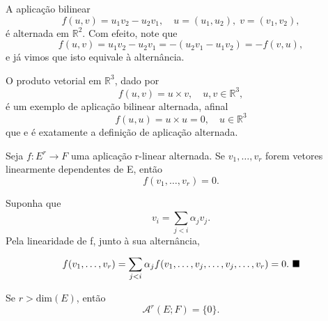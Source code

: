 \documentclass[../differential_forms.tex]{subfiles}
\begin{document}
\begin{example}
	A aplicação bilinear
	\[
		f(u, v)=u_1v_2-u_2v_1,\quad u=(u_1,u_2),\; v=(v_1, v_2),
	\]
	é alternada em \(\mathbb{R}^{2}.\) Com efeito, note que
	\[
		f(u, v)=u_1v_2-u_2v_1 = -(u_2v_1 - u_1v_2) = - f(v, u),
	\]
	e já vimos que isto equivale à alternância.
\end{example}
\begin{example}
	O produto vetorial em \(\mathbb{R}^{3}\), dado por
	\[
		f(u, v)=u \times v,\quad u, v\in \mathbb{R}^{3},
	\]
	é um exemplo de aplicação bilinear alternada, afinal
	\[
		f(u, u) = u \times u = 0, \quad u\in \mathbb{R}^{3}
	\]
	que e é exatamente a definição de aplicação alternada.
\end{example}
\begin{prop*}
	Seja \(f:E^{r}\rightarrow F\) uma aplicação r-linear alternada. Se \(v_1,\dotsc ,v_r\) forem vetores linearmente dependentes de E, então
	\[
		f(v_1,\dotsc , v_r)=0.
	\]
\end{prop*}
\begin{proof*}
	Suponha que
	\[
		v_{i} = \sum\limits_{j<i}^{}\alpha_{j}v_{j}.
	\]
	Pela linearidade de f, junto à sua alternância,
	\[
		f(v_1,\dotsc ,v_r)=\sum\limits_{j<i}^{}\alpha_{j}f(v_1,\dotsc , v_{j},\dotsc , v_{j}, \dotsc , v_r)=0. \text{ $\blacksquare$}
	\]
\end{proof*}
\begin{crl*}
	Se \(r>\mathrm{dim}(E)\), então
	\[
		\mathcal{A}^{r}(E; F)=\{0\}.
	\]
\end{crl*}
\end{document}
